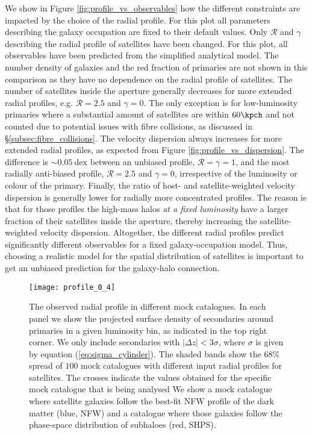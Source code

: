 \documentclass[fleqn,usenatbib,useAMS]{mnras}
\begin{document}
	We show in Figure \ref{fig:profile_vs_observables} how the different constraints are impacted by the choice of the radial profile. For this plot all parameters describing the galaxy occupation are fixed to their default values. Only $\mathcal{R}$ and $\gamma$ describing the radial profile of satellites have been changed. For this plot, all observables have been predicted from the simplified analytical model. The number density of galaxies and the red fraction of primaries are not shown in this comparison as they have no dependence on the radial profile of satellites. The number of satellites inside the aperture generally decreases for more extended radial profiles, e.g. $\mathcal{R} = 2.5$ and $\gamma = 0$. The only exception is for low-luminosity primaries where a substantial amount of satellites are within $60 \kpch$ and not counted due to potential issues with fibre collisions, as discussed in \S\ref{subsec:fibre_collisions}. The velocity dispersion always increases for more extended radial profiles, as expected from Figure \ref{fig:profile_vs_dispersion}. The difference is $\sim 0.05 \ \mathrm{dex}$ between an unbiased profile, $\mathcal{R} = \gamma = 1$, and the most radially anti-biased profile, $\mathcal{R} = 2.5$ and $\gamma = 0$, irrespective of the luminosity or colour of the primary. Finally, the ratio of host- and satellite-weighted velocity dispersion is generally lower for radially more concentrated profiles. The reason is that for those profiles the high-mass halos \textit{at a fixed luminosity} have a larger fraction of their satellites inside the aperture, thereby increasing the satellite-weighted velocity dispersion. Altogether, the different radial profiles predict significantly different observables for a fixed galaxy-occupation model. Thus, choosing a realistic model for the spatial distribution of satellites is important to get an unbiased prediction for the galaxy-halo connection.
	\begin{figure*}
		\centering
		\texttt{[image: profile\_0\_4]}
		\caption{The observed radial profile in different mock catalogues. In each panel we show the projected surface density of secondaries around primaries in a given luminosity bin, as indicated in the top right corner. We only include secondaries with $|\Delta z| < 3 \sigma$, where $\sigma$ is given by equation (\ref{eq:sigma_cylinder}). The shaded bands show the $68\%$ spread of $100$ mock catalogues with different input radial profiles for satellites. The crosses indicate the values obtained for the specific mock catalogue that is being analysed We show a mock catalogue where satellite galaxies follow the best-fit NFW profile of the dark matter (blue, NFW) and a catalogue where those galaxies follow the phase-space distribution of subhaloes (red, SHPS).}
		\label{fig:profile_observed}
	\end{figure*}
	
\end{document}
